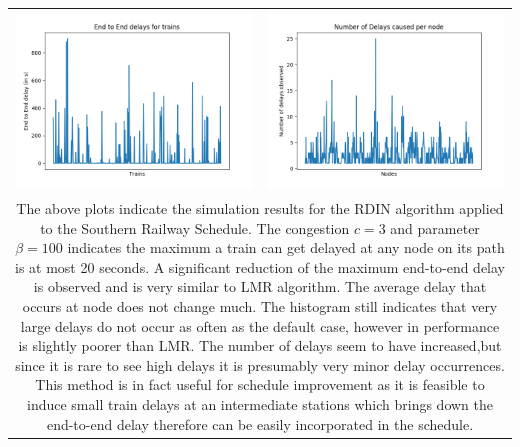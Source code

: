 \documentclass[twoside,11pt]{article}
\begin{document}
\begin{tabular}{cc}
\includegraphics[scale=0.4]{img/IND/figure_1-2.png} 
&
\includegraphics[scale=0.4]{img/IND/figure_1-3.png} \\
\multicolumn{2}{p{\textwidth}}{
The above plots indicate the simulation results for the RDIN algorithm applied to the Southern Railway Schedule. The congestion $c = 3$ and parameter $\beta = 100$ indicates the maximum a train can get delayed at any node on its path is at most 20 seconds.\newline \newline
A significant reduction of the maximum end-to-end delay is observed and is very similar to LMR algorithm. The average delay that occurs at node does not change much. The histogram still indicates that very large delays do not occur as often as the default case, however in performance is slightly poorer than LMR. The number of delays seem to have increased,but since it is rare to see high delays it is presumably very minor delay occurrences. \newline \newline
This method is in fact useful for schedule improvement as it is feasible to induce small train delays at an intermediate stations which brings down the end-to-end delay therefore can be easily incorporated in the schedule.
\vspace{1.6in}}

\end{tabular}
\end{document}
